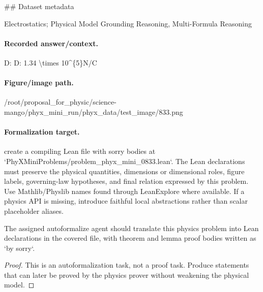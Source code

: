 \#\# Dataset metadata

Electrostatics; Physical Model Grounding Reasoning, Multi-Formula Reasoning

\paragraph{Recorded answer/context.}
D: D: 1.34 \textbackslash{}times 10\textasciicircum{}\{5\}N/C

\paragraph{Figure/image path.}
/root/proposal\_for\_physic/science-mango/phyx\_mini\_run/phyx\_data/test\_image/833.png

\paragraph{Formalization target.}
create a compiling Lean file with sorry bodies at `PhyXMiniProblems/problem\_phyx\_mini\_0833.lean`. The Lean declarations must preserve the physical quantities, dimensions or dimensional roles, figure labels, governing-law hypotheses, and final relation expressed by this problem.
Use Mathlib/Physlib names found through LeanExplore where available. If a physics API is missing, introduce faithful local abstractions rather than scalar placeholder aliases.

\begin{theorem}
\label{thm:physics:phyx_mini_0833:target}
The assigned autoformalize agent should translate this physics problem into Lean declarations in the covered file, with theorem and lemma proof bodies written as `by sorry`.
\end{theorem}
\begin{proof}
This is an autoformalization task, not a proof task. Produce statements that can later be proved by the physics prover without weakening the physical model.
\end{proof}

